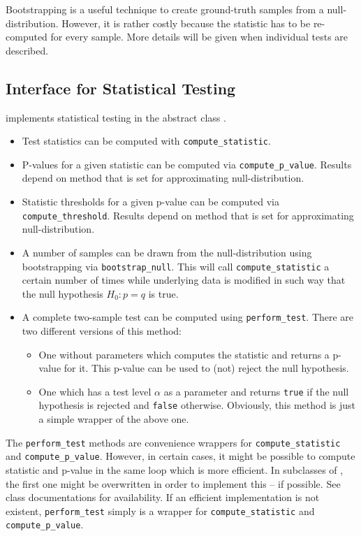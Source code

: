 Bootstrapping is a useful technique to create ground-truth samples from a null-distribution. However, it is rather costly because the statistic has to be re-computed for every sample. More details will be given when individual tests are described.

\subsection*{Interface for Statistical Testing}
\shogun{} implements statistical testing in the abstract class .
\begin{itemize}
\item Test statistics can be computed with \texttt{compute\_statistic}.
\item P-values for a given statistic can be computed via \texttt{compute\_p\_value}. Results depend on method that is set for approximating null-distribution.
\item Statistic thresholds for a given p-value can be computed via \texttt{compute\_threshold}. Results depend on method that is set for approximating null-distribution.
\item A number of samples can be drawn from the null-distribution using bootstrapping via \texttt{bootstrap\_null}. This will call \texttt{compute\_statistic} a certain number of times while underlying data is modified in such way that the null hypothesis $H_0:p=q$ is true.
\item A complete two-sample test can be computed using \texttt{perform\_test}. There are two different versions of this method:
\begin{itemize}
\item  One without parameters which computes the statistic and returns a p-value for it. This p-value can be used to (not) reject the null hypothesis.
\item One which has a test level $\alpha$ as a parameter and returns \texttt{true} if the null hypothesis is rejected and \texttt{false} otherwise. Obviously, this method is just a simple wrapper of the above one.
\end{itemize}
\end{itemize}

The \texttt{perform\_test} methods are convenience wrappers for \texttt{compute\_statistic} and \texttt{compute\_p\_value}. However, in certain cases, it might be possible to compute statistic and p-value in the same loop which is more efficient. In subclasses of , the first one might be overwritten in order to implement this -- if possible. See class documentations for availability. If an  efficient implementation is not existent, \texttt{perform\_test} simply is a wrapper for  \texttt{compute\_statistic} and \texttt{compute\_p\_value}.



